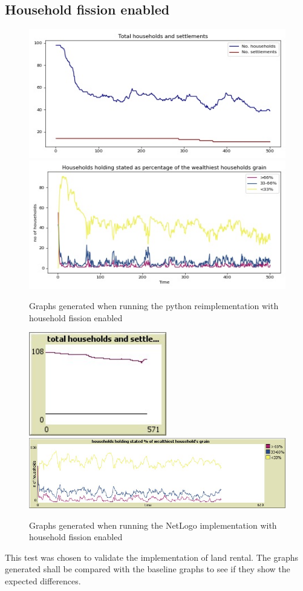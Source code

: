 \documentclass[12pt]{article}
\begin{document}
			\subsection{Household fission enabled}
				\begin{figure}[!htb]
					\includegraphics[width=12cm]{Fission_run1_A}\\
					\includegraphics[width=12cm]{Fission_run1_B}
					\caption{Graphs generated when running the python reimplementation with household fission enabled}
					\label{fig:Fission_enabled_ours_1}
				\end{figure}
				
				\begin{figure}[!htb]
					\includegraphics[width=6cm]{Fission_run1_C}\\
					\includegraphics[width=15cm]{Fission_run1_D}
					\caption{Graphs generated when running the NetLogo implementation with household fission enabled}
					\label{fig:Fission_enabled_Netlogo_1}
				\end{figure}
				This test was chosen to validate the implementation of land rental. The graphs generated shall be compared with the baseline graphs to see if they show the expected differences.
			
\end{document}

